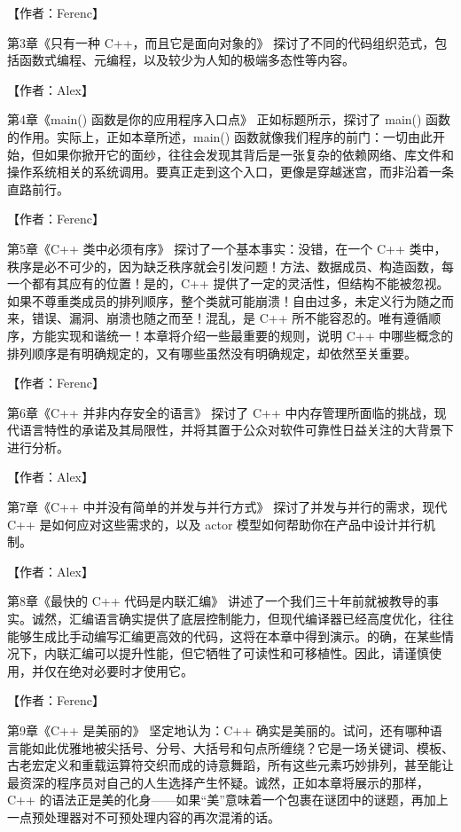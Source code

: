 【作者：Ferenc】

第3章《只有一种 C++，而且它是面向对象的》 探讨了不同的代码组织范式，包括函数式编程、元编程，以及较少为人知的极端多态性等内容。

【作者：Alex】

第4章《main() 函数是你的应用程序入口点》 正如标题所示，探讨了 main() 函数的作用。实际上，正如本章所述，main() 函数就像我们程序的前门：一切由此开始，但如果你掀开它的面纱，往往会发现其背后是一张复杂的依赖网络、库文件和操作系统相关的系统调用。要真正走到这个入口，更像是穿越迷宫，而非沿着一条直路前行。

【作者：Ferenc】

第5章《C++ 类中必须有序》 探讨了一个基本事实：没错，在一个 C++ 类中，秩序是必不可少的，因为缺乏秩序就会引发问题！方法、数据成员、构造函数，每一个都有其应有的位置！是的，C++ 提供了一定的灵活性，但结构不能被忽视。如果不尊重类成员的排列顺序，整个类就可能崩溃！自由过多，未定义行为随之而来，错误、漏洞、崩溃也随之而至！混乱，是 C++ 所不能容忍的。唯有遵循顺序，方能实现和谐统一！本章将介绍一些最重要的规则，说明 C++ 中哪些概念的排列顺序是有明确规定的，又有哪些虽然没有明确规定，却依然至关重要。

【作者：Ferenc】

第6章《C++ 并非内存安全的语言》 探讨了 C++ 中内存管理所面临的挑战，现代语言特性的承诺及其局限性，并将其置于公众对软件可靠性日益关注的大背景下进行分析。

【作者：Alex】

第7章《C++ 中并没有简单的并发与并行方式》 探讨了并发与并行的需求，现代 C++ 是如何应对这些需求的，以及 actor 模型如何帮助你在产品中设计并行机制。

【作者：Alex】

第8章《最快的 C++ 代码是内联汇编》 讲述了一个我们三十年前就被教导的事实。诚然，汇编语言确实提供了底层控制能力，但现代编译器已经高度优化，往往能够生成比手动编写汇编更高效的代码，这将在本章中得到演示。的确，在某些情况下，内联汇编可以提升性能，但它牺牲了可读性和可移植性。因此，请谨慎使用，并仅在绝对必要时才使用它。

【作者：Ferenc】

第9章《C++ 是美丽的》 坚定地认为：C++ 确实是美丽的。试问，还有哪种语言能如此优雅地被尖括号、分号、大括号和句点所缠绕？它是一场关键词、模板、古老宏定义和重载运算符交织而成的诗意舞蹈，所有这些元素巧妙排列，甚至能让最资深的程序员对自己的人生选择产生怀疑。诚然，正如本章将展示的那样，C++ 的语法正是美的化身——如果“美”意味着一个包裹在谜团中的谜题，再加上一点预处理器对不可预处理内容的再次混淆的话。


